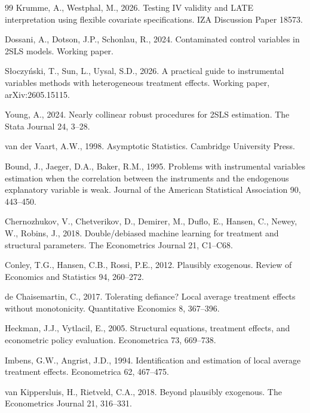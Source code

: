 \documentclass[preprint,11pt,authoryear]{elsarticle}
\theoremstyle{definition}
\begin{document}
\begin{thebibliography}{99}
Krumme, A., Westphal, M., 2026. Testing IV validity and LATE interpretation using
flexible covariate specifications. IZA Discussion Paper 18573.

Dossani, A., Dotson, J.P., Schonlau, R., 2024. Contaminated control variables in
2SLS models. Working paper.

S{\l}oczy{\'n}ski, T., Sun, L., Uysal, S.D., 2026. A practical guide to
instrumental variables methods with heterogeneous treatment effects. Working
paper, arXiv:2605.15115.

Young, A., 2024. Nearly collinear robust procedures for 2SLS estimation. The Stata
Journal 24, 3--28.

van der Vaart, A.W., 1998. Asymptotic Statistics. Cambridge University Press.

Bound, J., Jaeger, D.A., Baker, R.M., 1995. Problems with instrumental variables
estimation when the correlation between the instruments and the endogenous
explanatory variable is weak. Journal of the American Statistical Association 90,
443--450.

Chernozhukov, V., Chetverikov, D., Demirer, M., Duflo, E., Hansen, C., Newey, W.,
Robins, J., 2018. Double/debiased machine learning for treatment and structural
parameters. The Econometrics Journal 21, C1--C68.

Conley, T.G., Hansen, C.B., Rossi, P.E., 2012. Plausibly exogenous. Review of
Economics and Statistics 94, 260--272.

de Chaisemartin, C., 2017. Tolerating defiance? Local average treatment effects
without monotonicity. Quantitative Economics 8, 367--396.

Heckman, J.J., Vytlacil, E., 2005. Structural equations, treatment effects, and
econometric policy evaluation. Econometrica 73, 669--738.

Imbens, G.W., Angrist, J.D., 1994. Identification and estimation of local average
treatment effects. Econometrica 62, 467--475.

van Kippersluis, H., Rietveld, C.A., 2018. Beyond plausibly exogenous. The
Econometrics Journal 21, 316--331.


\end{thebibliography}
\end{document}
